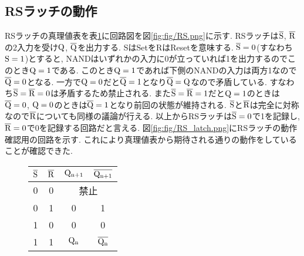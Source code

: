 \subsection{RSラッチの動作}
RSラッチの真理値表を表\ref{tab:rslatch}に回路図を図\ref{fig:fig/RS.png}に示す.
RSラッチは$\rm \overline{S}$, $\rm \overline{R}$の2入力を受け$\rm Q$, $\rm \overline{Q}$を出力する.
SはSetをRはResetを意味する.
$\rm\overline{S}=0$(すなわち$\rm S=1$)とすると,
NANDはいずれかの入力に0が立っていれば1を出力するのでこのとき$\rm Q=1$である.
このとき$\rm Q=1$であれば下側のNANDの入力は両方1なので$\rm\overline{Q}=0$となる.
一方で$\rm Q=0$だと$\rm\overline{Q}=1$となり$\rm\overline{Q}=Q$なので矛盾している.
すなわち$\rm\overline{S}=\overline{R}=0$は矛盾するため禁止される.
また$\rm\overline{S}=\overline{R}=1$だと$\rm Q=1$のときは$\rm\overline{Q}=0$,
$\rm Q=0$のときは$\rm\overline{Q}=1$となり前回の状態が維持される.
$\rm\overline{S}$と$\rm\overline{R}$は完全に対称なので$\rm\overline{R}$についても同様の議論が行える.
以上からRSラッチは$\rm\overline{S}=0$で1を記録し,
$\rm\overline{R}=0$で0を記録する回路だと言える.
図\ref{fig:fig/RS_latch.png}にRSラッチの動作確認用の回路を示す.
これにより真理値表から期待される通りの動作をしていることが確認できた.
\begin{figure}[h]
  \def\@captype{table}
  \begin{minipage}[t]{.48\textwidth}
    \begin{center}
      \begin{tabular}{cccc}
        \hline
        $\rm\overline{S}$ & $\rm\overline{R}$ & $\rm Q_{n+1}$ & $\rm\overline{Q_{n+1}}$\\
        \hline
        0 & 0 & \multicolumn{2}{c}{禁止}\\
        0 & 1 & 0 & 1\\
        1 & 0 & 0 & 0\\
        1 & 1 & $\rm Q_n$ & $\rm \overline{Q_n}$\\
        \hline
      \end{tabular}
    \end{center}
    \label{tab:rslatch}
  \end{minipage}
  \hfill
  \begin{minipage}[c]{.48\textwidth}
  \end{minipage}
\end{figure}
\clearpage
